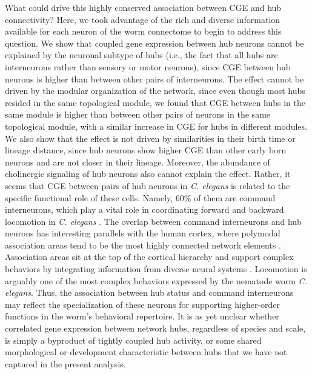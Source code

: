 \documentclass[10pt,letterpaper]{article}
\begin{document}
{%
What could drive this highly conserved association between CGE and hub connectivity?
Here, we took advantage of the rich and diverse information available for each neuron of the worm connectome to begin to address this question.
We show that coupled gene expression between hub neurons cannot be explained by the neuronal subtype of hubs (i.e., the fact that all hubs are interneurons rather than  sensory or motor neurons), since CGE between hub neurons is higher than between other pairs of interneurons.
The effect cannot be driven by the modular organization of the network, since even though most hubs resided in the same topological module, we found that CGE between hubs in the same module is higher than between other pairs of neurons in the same topological module, with a similar increase in CGE for hubs in different modules.
We also show that the effect is not driven by similarities in their birth time or lineage distance, since hub neurons show higher CGE than other early born neurons and are not closer in their lineage.
Moreover, the abundance of cholinergic signaling of hub neurons also cannot explain the effect.
Rather, it seems that CGE between pairs of hub neurons in \textit{C. elegans} is related to the specific functional role of these cells.
Namely, 60\% of them are command interneurons, which play a vital role in coordinating forward and backward locomotion in \textit{C. elegans} \cite{Kim2016}.
The overlap between command interneurons and hub neurons has interesting parallels with the human cortex, where polymodal association areas tend to be the most highly connected network elements \cite{VandenHeuvel2016}.
Association areas sit at the top of the cortical hierarchy and support complex behaviors by integrating information from diverse neural systems \cite{Mesulam1998}.
Locomotion is arguably one of the most complex behaviors expressed by the nematode worm \emph{C. elegans}.
Thus, the association between hub status and command interneurons may reflect the specialization of these neurons for supporting higher-order functions in the worm's behavioral repertoire.
It is as yet unclear whether correlated gene expression between network hubs, regardless of species and scale, is simply a byproduct of tightly coupled hub activity, or some shared morphological or development characteristic between hubs that we have not captured in the present analysis.
}
\end{document}
